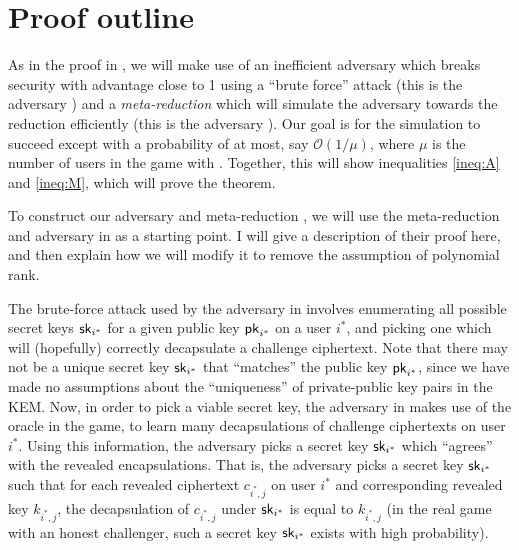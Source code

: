 
\section{Proof outline}


As in the proof in \cite{AC:HanLiuGu21},
we will make use of an inefficient adversary
which breaks \OWECPA security with advantage close to 1
using a ``brute force'' attack
(this is the adversary \advA)
and a \emph{meta-reduction} which will simulate the adversary
\advA towards the reduction \redR efficiently (this is the adversary \redM).
Our goal is for the simulation to succeed except with a probability
of at most, say \(\mathcal{O}(1/\mu)\), where \(\mu\) is the number of users
in the \OWECPA game with \advA.
Together, this will show inequalities \eqref{ineq:A} and \eqref{ineq:M},
which will prove the theorem.

To construct our adversary \advA and meta-reduction \redM,
we will use the meta-reduction and adversary in \cite{AC:HanLiuGu21}
as a starting point.
I will give a description of their proof here,
and then explain how we will modify it to remove the assumption of polynomial rank.

The brute-force attack used by the adversary in \cite{AC:HanLiuGu21}
involves enumerating all possible secret keys \(\mathsf{sk}_{i^{*}}\)
for a given public key \(\mathsf{pk}_{i^{*}}\) on a user \(i^{*}\),
and picking one which will (hopefully)
correctly decapsulate a challenge ciphertext.
Note that there may not be a unique secret key \(\mathsf{sk}_{i^{*}}\)
that ``matches'' the public key \(\mathsf{pk}_{i^{*}}\),
since we have made no assumptions about
the ``uniqueness'' of private-public key pairs in the KEM.
Now, in order to pick a viable secret key,
the adversary in \cite{AC:HanLiuGu21}
makes use of the \Reveal oracle in the \ECPA game,
to learn many decapsulations of challenge ciphertexts on user \(i^{*}\).
Using this information, the adversary picks a secret key \(\mathsf{sk}_{i^{*}}\)
which ``agrees'' with the revealed encapsulations.
That is, the adversary picks a secret key \(\mathsf{sk}_{i^{*}}\)
such that for each revealed ciphertext \(c_{i^{*},j}\) on user \(i^{*}\)
and corresponding revealed key \(k_{i^{*},j}\),
the decapsulation of \(c_{i^{*},j}\)
under \(\mathsf{sk}_{i^{*}}\) is equal to \(k_{i^{*},j}\)
(in the real game with an honest challenger,
such a secret key \(\mathsf{sk}_{i^{*}}\) exists with high probability).

